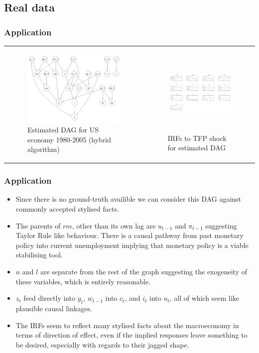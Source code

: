 \documentclass{beamer}
\begin{document}
\subsection{Real data}
\begin{frame}
    \frametitle{Application}
    \begin{tabular}{ p{5cm} p{5cm} }
        \begin{figure}
            \centering
            \includegraphics[width=5cm]{images/real_hybrid_structure.png}
            \caption{Estimated DAG for US economy 1980-2005 (hybrid algorithm)}
            \label{dag4}
          \end{figure}
        &
        \begin{figure}
            \centering
            \includegraphics[width=5cm,height=4cm]{images/real_z_irf.png}
            \caption{IRFs to TFP shock for estimated DAG}
            \label{dag5}
          \end{figure}
    \end{tabular}
\end{frame}

\begin{frame}
    \frametitle{Application}
    \begin{itemize}
        \item Since there is no ground-truth availible we can consider this DAG against commonly accepted stylised facts.
        \item The parents of $rm$, other than its own lag are $u_{t-1}$ and $\pi_{t-1}$ suggesting Taylor Rule like behaviour. There is a causal pathway from past monetary policy into current unemployment implying that monetary policy is a viable stabilising tool. 
        \item $n$ and $l$ are separate from the rest of the graph suggesting the exogeneity of these variables, which is entirely reasonable. 
        \item $z_t$ feed directly into $y_t$, $w_{t-1}$ into $c_t$, and $i_t$ into $u_t$, all of which seem like plausible causal linkages.
        \item The IRFs seem to reflect many stylised facts about the macroeconomy in terms of direction of effect, even if the implied responses leave something to be desired, especially with regards to their jagged shape. 
    \end{itemize}
\end{frame}
\end{document}
